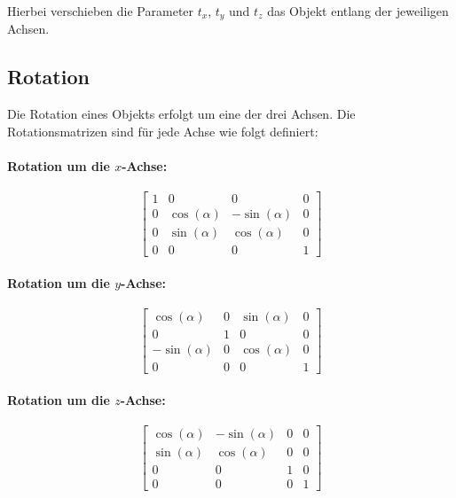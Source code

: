 Hierbei verschieben die Parameter \(t_x\), \(t_y\) und \(t_z\) das Objekt entlang der jeweiligen Achsen.

\subsection{Rotation}

Die Rotation eines Objekts erfolgt um eine der drei Achsen. Die Rotationsmatrizen sind für jede Achse wie folgt definiert:

\paragraph{Rotation um die \(x\)-Achse:}
\begin{equation}
\begin{bmatrix}
1 & 0 & 0 & 0 \\
0 & \cos(\alpha) & -\sin(\alpha) & 0 \\
0 & \sin(\alpha) & \cos(\alpha) & 0 \\
0 & 0 & 0 & 1
\end{bmatrix}
\end{equation}

\paragraph{Rotation um die \(y\)-Achse:}
\begin{equation}
\begin{bmatrix}
\cos(\alpha) & 0 & \sin(\alpha) & 0 \\
0 & 1 & 0 & 0 \\
-\sin(\alpha) & 0 & \cos(\alpha) & 0 \\
0 & 0 & 0 & 1
\end{bmatrix}
\end{equation}

\paragraph{Rotation um die \(z\)-Achse:}
\begin{equation}
\begin{bmatrix}
\cos(\alpha) & -\sin(\alpha) & 0 & 0 \\
\sin(\alpha) & \cos(\alpha) & 0 & 0 \\
0 & 0 & 1 & 0 \\
0 & 0 & 0 & 1
\end{bmatrix}
\end{equation}

